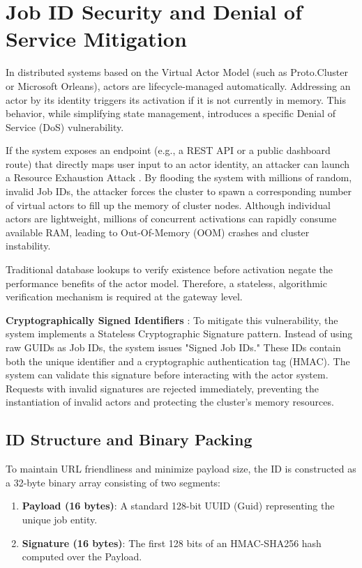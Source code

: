 \section{Job ID Security and Denial of Service Mitigation}

In distributed systems based on the Virtual Actor Model (such as Proto.Cluster or Microsoft Orleans), actors are lifecycle-managed automatically. Addressing an actor by its identity triggers its activation if it is not currently in memory. This behavior, while simplifying state management, introduces a specific Denial of Service (DoS) vulnerability.

If the system exposes an endpoint (e.g., a REST API or a public dashboard route) that directly maps user input to an actor identity, an attacker can launch a Resource Exhaustion Attack \cite{enwiki:1348504761}. By flooding the system with millions of random, invalid Job IDs, the attacker forces the cluster to spawn a corresponding number of virtual actors to fill up the memory of cluster nodes. Although individual actors are lightweight, millions of concurrent activations can rapidly consume available RAM, leading to Out-Of-Memory (OOM) crashes and cluster instability.

Traditional database lookups to verify existence before activation negate the performance benefits of the actor model. Therefore, a stateless, algorithmic verification mechanism is required at the gateway level.

\textbf{Cryptographically Signed Identifiers} \cite{enwiki:1307921147}: To mitigate this vulnerability, the system implements a Stateless Cryptographic Signature pattern. Instead of using raw GUIDs as Job IDs, the system issues "Signed Job IDs." These IDs contain both the unique identifier and a cryptographic authentication tag (HMAC). The system can validate this signature before interacting with the actor system. Requests with invalid signatures are rejected immediately, preventing the instantiation of invalid actors and protecting the cluster's memory resources.

\subsection{ID Structure and Binary Packing}
To maintain URL friendliness and minimize payload size, the ID is constructed as a 32-byte binary array consisting of two segments:

\begin{enumerate}
    \item \textbf{Payload (16 bytes)}: A standard 128-bit UUID (Guid) representing the unique job entity.
    \item \textbf{Signature (16 bytes)}: The first 128 bits of an HMAC-SHA256 hash computed over the Payload.
\end{enumerate}

